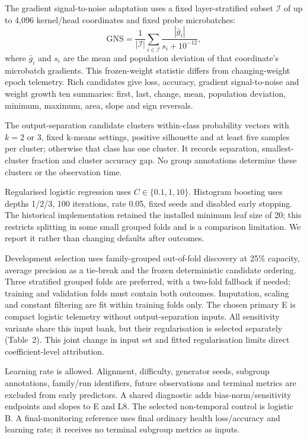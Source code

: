 The gradient signal-to-noise adaptation uses a fixed layer-stratified subset $\mathcal I$ of up to 4,096 kernel/head coordinates and fixed probe microbatches:
\begin{equation}
\mathrm{GNS}=\frac{1}{|\mathcal I|}\sum_{i\in\mathcal I}\frac{|\bar g_i|}{s_i+10^{-12}},
\label{eq:gns}
\tag{8}\end{equation}
where $\bar g_i$ and $s_i$ are the mean and population deviation of that coordinate's microbatch gradients. This frozen-weight statistic differs from changing-weight epoch telemetry. Rich candidates give loss, accuracy, gradient signal-to-noise and weight growth ten summaries: first, last, change, mean, population deviation, minimum, maximum, area, slope and sign reversals.

The output-separation candidate clusters within-class probability vectors with $k=2$ or $3$, fixed k-means settings, positive silhouette and at least five samples per cluster; otherwise that class has one cluster. It records separation, smallest-cluster fraction and cluster accuracy gap. No group annotations determine these clusters or the observation time.

Regularised logistic regression uses $C\in\{0.1,1,10\}$. Histogram boosting uses depths 1/2/3, 100 iterations, rate 0.05, fixed seeds and disabled early stopping. The historical implementation retained the installed minimum leaf size of 20; this restricts splitting in some small grouped folds and is a comparison limitation. We report it rather than changing defaults after outcomes.

Development selection uses family-grouped out-of-fold discovery at 25\% capacity, average precision as a tie-break and the frozen deterministic candidate ordering. Three stratified grouped folds are preferred, with a two-fold fallback if needed; training and validation folds must contain both outcomes. Imputation, scaling and constant filtering are fit within training folds only. The chosen primary E is compact logistic telemetry without output-separation inputs. All sensitivity variants share this input bank, but their regularisation is selected separately (Table~2). This joint change in input set and fitted regularisation limits direct coefficient-level attribution.

Learning rate is allowed. Alignment, difficulty, generator seeds, subgroup annotations, family/run identifiers, future observations and terminal metrics are excluded from early predictors. A shared diagnostic adds bias-norm/sensitivity endpoints and slopes to E and L8. The selected non-temporal control is logistic B. A final-monitoring reference uses final ordinary health loss/accuracy and learning rate; it receives no terminal subgroup metrics as inputs.

